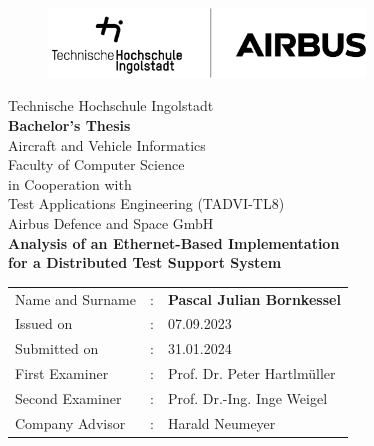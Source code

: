 
\begin{titlepage}	
	\begin{figure}[!h]
		\centering
		\includegraphics[width={0.75\textwidth}]{figures/logo.png}	
	\end{figure}																		
	
	\vfill
	
	\begin{center}
		\Large{Technische Hochschule Ingolstadt}	 \\ 
		\huge\textbf{
			Bachelor's Thesis}\\[0.7em]
		\normalsize
			Aircraft and Vehicle Informatics\\ Faculty of Computer Science\\ [2.9em]
			
		\normalsize
			in Cooperation with\\Test Applications Engineering (TADVI-TL8)\\ Airbus Defence and Space GmbH\\ [5em]
	
		\Large\textbf{Analysis of an Ethernet-Based Implementation\\ for a Distributed Test Support System}	 \\ 

	\end{center}

	\vfill
	\vfill
	
	\begin{tabular}{lll}
		Name and Surname &: & \textbf{Pascal Julian Bornkessel}	\\ [2em]
		
		Issued on &:	& 07.09.2023	\\ [1em] %
		Submitted on &:	& 31.01.2024\\ [2em] %
		
		First Examiner &: 	& Prof. Dr. Peter Hartlmüller\\ [1em]
		Second Examiner &: 	& Prof. Dr.-Ing. Inge Weigel\\[2em]
		
		Company Advisor &:	& Harald Neumeyer \\ %
	\end{tabular}
	
\end{titlepage}

\restoregeometry